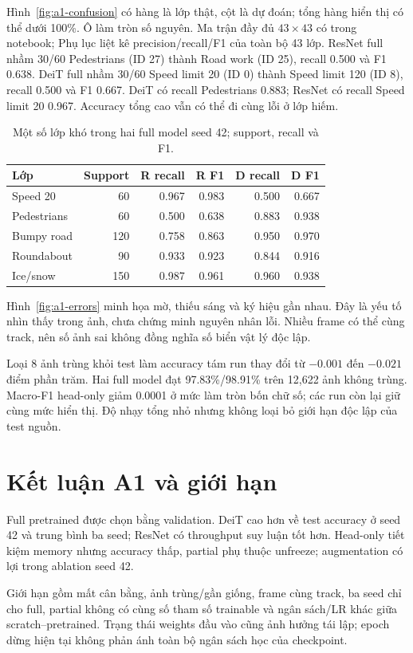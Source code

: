 Hình~\ref{fig:a1-confusion} có hàng là lớp thật, cột là dự đoán;
tổng hàng hiển thị có thể dưới 100\%. Ô làm tròn số nguyên.
Ma trận đầy đủ $43\times43$ có trong
notebook; Phụ lục liệt kê precision/recall/F1 của toàn bộ 43 lớp.
ResNet full nhầm 30/60 Pedestrians (ID 27) thành Road work (ID 25),
recall 0.500 và F1 0.638. DeiT full nhầm 30/60 Speed limit 20 (ID 0)
thành Speed limit 120 (ID 8), recall 0.500 và F1 0.667.
DeiT có recall Pedestrians 0.883; ResNet có recall Speed limit 20
0.967. Accuracy tổng cao vẫn có thể đi cùng lỗi ở lớp hiếm.
\begin{table}[H]\centering\caption{Một số lớp khó trong hai full model seed 42; support, recall và F1.}
\small\begin{tabular}{lrrrrr}\toprule
Lớp & Support & R recall & R F1 & D recall & D F1\\\midrule
Speed 20 &60&0.967&0.983&0.500&0.667\\
Pedestrians &60&0.500&0.638&0.883&0.938\\
Bumpy road &120&0.758&0.863&0.950&0.970\\
Roundabout &90&0.933&0.923&0.844&0.916\\
Ice/snow &150&0.987&0.961&0.960&0.938\\\bottomrule
\end{tabular}\label{table:a1-5}
\end{table}

Hình~\ref{fig:a1-errors} minh họa mờ, thiếu sáng và ký hiệu gần nhau. Đây là yếu tố nhìn
thấy trong ảnh, chưa chứng minh nguyên nhân lỗi. Nhiều frame có thể
cùng track, nên số ảnh sai không đồng nghĩa số biển vật lý độc lập.

Loại 8 ảnh trùng khỏi test làm accuracy tám run thay đổi từ $-0.001$
đến $-0.021$ điểm phần trăm. Hai full model đạt 97.83\%/98.91\%
trên 12,622 ảnh không trùng. Macro-F1 head-only giảm 0.0001 ở mức làm
tròn bốn chữ số; các run còn lại giữ cùng mức hiển thị. Độ nhạy tổng
nhỏ nhưng không loại bỏ giới hạn độc lập của test nguồn.

\section{Kết luận A1 và giới hạn}
Full pretrained được chọn bằng validation. DeiT cao hơn về test accuracy
ở seed 42 và trung bình ba seed; ResNet có throughput suy luận tốt hơn.
Head-only tiết kiệm memory nhưng accuracy thấp, partial phụ thuộc unfreeze;
augmentation có lợi trong ablation seed 42.

Giới hạn gồm mất cân bằng, ảnh trùng/gần giống, frame cùng track, ba seed
chỉ cho full, partial không có cùng số tham số trainable và ngân sách/LR khác giữa
scratch--pretrained. Trạng thái weights đầu vào cũng ảnh hưởng tái lập;
epoch dừng hiện tại không phản ánh toàn bộ ngân sách học của checkpoint.
